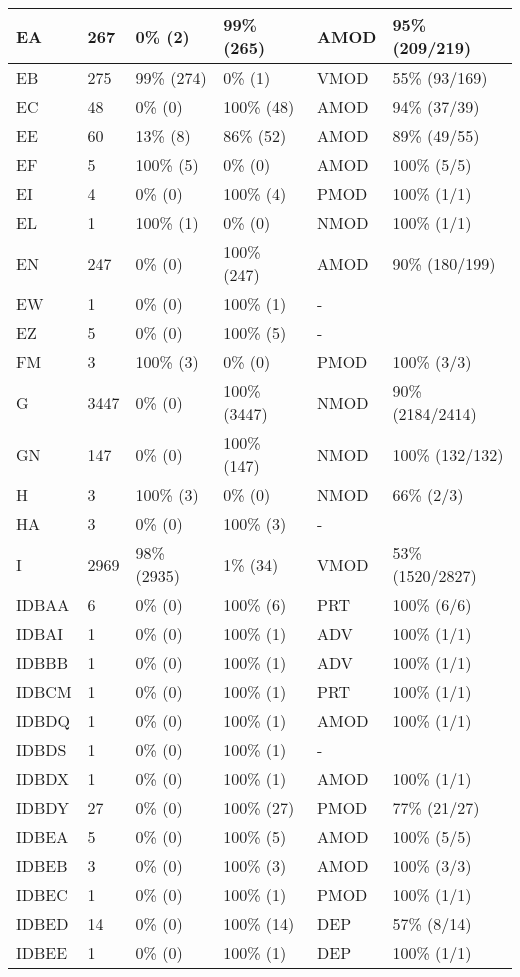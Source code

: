 \begin{figure*}
\begin{tabular}{|l|l|l|l||l|l|}
\hline
 EA & 267 & 0\% (2) & 99\% (265) & AMOD & 95\% (209/219) \\ 
\hline
 EB & 275 & 99\% (274) & 0\% (1) & VMOD & 55\% (93/169) \\ 
\hline
 EC & 48 & 0\% (0) & 100\% (48) & AMOD & 94\% (37/39) \\ 
\hline
 EE & 60 & 13\% (8) & 86\% (52) & AMOD & 89\% (49/55) \\ 
\hline
 EF & 5 & 100\% (5) & 0\% (0) & AMOD & 100\% (5/5) \\ 
\hline
 EI & 4 & 0\% (0) & 100\% (4) & PMOD & 100\% (1/1) \\ 
\hline
 EL & 1 & 100\% (1) & 0\% (0) & NMOD & 100\% (1/1) \\ 
\hline
 EN & 247 & 0\% (0) & 100\% (247) & AMOD & 90\% (180/199) \\ 
\hline
 EW & 1 & 0\% (0) & 100\% (1) & - &  \\ 
\hline
 EZ & 5 & 0\% (0) & 100\% (5) & - &  \\ 
\hline
 FM & 3 & 100\% (3) & 0\% (0) & PMOD & 100\% (3/3) \\ 
\hline
 G & 3447 & 0\% (0) & 100\% (3447) & NMOD & 90\% (2184/2414) \\ 
\hline
 GN & 147 & 0\% (0) & 100\% (147) & NMOD & 100\% (132/132) \\ 
\hline
 H & 3 & 100\% (3) & 0\% (0) & NMOD & 66\% (2/3) \\ 
\hline
 HA & 3 & 0\% (0) & 100\% (3) & - &  \\ 
\hline
 I & 2969 & 98\% (2935) & 1\% (34) & VMOD & 53\% (1520/2827) \\ 
\hline
 IDBAA & 6 & 0\% (0) & 100\% (6) & PRT & 100\% (6/6) \\ 
\hline
 IDBAI & 1 & 0\% (0) & 100\% (1) & ADV & 100\% (1/1) \\ 
\hline
 IDBBB & 1 & 0\% (0) & 100\% (1) & ADV & 100\% (1/1) \\ 
\hline
 IDBCM & 1 & 0\% (0) & 100\% (1) & PRT & 100\% (1/1) \\ 
\hline
 IDBDQ & 1 & 0\% (0) & 100\% (1) & AMOD & 100\% (1/1) \\ 
\hline
 IDBDS & 1 & 0\% (0) & 100\% (1) & - &  \\ 
\hline
 IDBDX & 1 & 0\% (0) & 100\% (1) & AMOD & 100\% (1/1) \\ 
\hline
 IDBDY & 27 & 0\% (0) & 100\% (27) & PMOD & 77\% (21/27) \\ 
\hline
 IDBEA & 5 & 0\% (0) & 100\% (5) & AMOD & 100\% (5/5) \\ 
\hline
 IDBEB & 3 & 0\% (0) & 100\% (3) & AMOD & 100\% (3/3) \\ 
\hline
 IDBEC & 1 & 0\% (0) & 100\% (1) & PMOD & 100\% (1/1) \\ 
\hline
 IDBED & 14 & 0\% (0) & 100\% (14) & DEP & 57\% (8/14) \\ 
\hline
 IDBEE & 1 & 0\% (0) & 100\% (1) & DEP & 100\% (1/1) \\ 
\hline
\end{tabular}
\end{figure*}
